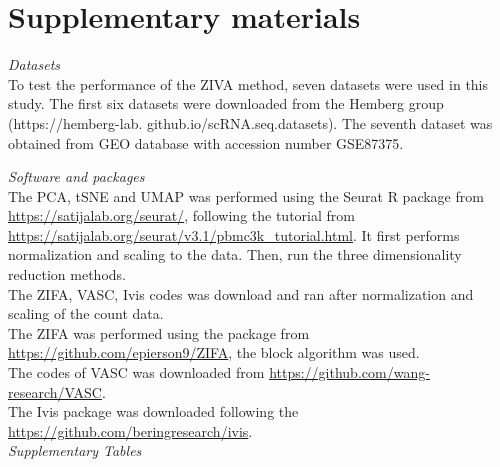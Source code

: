 \section{Supplementary materials}
\noindent\emph{Datasets} \\
To test the performance of the ZIVA method, seven datasets were used in this study. The first six datasets were downloaded from the Hemberg group (https://hemberg-lab. github.io/scRNA.seq.datasets). The seventh dataset was obtained from GEO database with accession number GSE87375.

\vspace{0.5cm}
\noindent\emph{Software and packages} \\
The PCA, tSNE and UMAP was performed using the Seurat R package from \url{https://satijalab.org/seurat/}, following the tutorial from \url{https://satijalab.org/seurat/v3.1/pbmc3k_tutorial.html}. It first performs normalization and scaling to the data. Then, run the three dimensionality reduction methods.\\
The ZIFA, VASC, Ivis codes was download and ran after normalization and scaling of the count data.\\
The ZIFA was performed using the package from \url{https://github.com/epierson9/ZIFA}, the block algorithm was used.\\
The codes of VASC was downloaded from \url{https://github.com/wang-research/VASC}.\\
The Ivis package was downloaded following the \url{https://github.com/beringresearch/ivis}.\\

\vspace{0.5cm}
\noindent\emph{Supplementary Tables} \\
\begin{table}[htb!]
\centering
\caption{scRNA-seq datasets used in this study}
\label{datasets}
\end{table}


